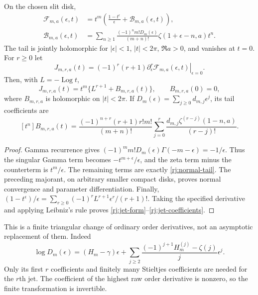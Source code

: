 \begin{theorem}\label{rj:pure}
On the chosen slit disk,
\begin{align}
 \mathcal F_{m,a}(\epsilon,t)
 &=t^m\left(\frac{1-t^\epsilon}{\epsilon}
                  +\mathcal B_{m,a}(\epsilon,t)\right),\label{rj:normal-form}\\
 \mathcal B_{m,a}(\epsilon,t)
 &=\sum_{n\ge1}\frac{(-1)^n m!D_m(\epsilon)}{(m+n)!}
                  \zeta(1+\epsilon-n,a)t^n.\label{rj:normal-tail}
\end{align}
The tail is jointly holomorphic for $|\epsilon|<1$, $|t|<2\pi$,
$\Re a>0$, and vanishes at $t=0$. For $r\ge0$ let
\[
 J_{m,r,a}(t)=(-1)^r(r+1)
       \left.\partial_\epsilon^r\mathcal F_{m,a}(\epsilon,t)
       \right|_{\epsilon=0}.
\]
Then, with $L=-\operatorname{Log}t$,
\begin{equation}\label{rj:jet-form}
 J_{m,r,a}(t)=t^m\{L^{r+1}+B_{m,r,a}(t)\},\qquad
 B_{m,r,a}(0)=0,
\end{equation}
where $B_{m,r,a}$ is holomorphic on $|t|<2\pi$.
If $D_m(\epsilon)=\sum_{j\ge0}d_{m,j}\epsilon^j$, its tail coefficients are
\begin{equation}\label{rj:jet-coefficients}
 [t^n]B_{m,r,a}(t)
 =\frac{(-1)^{n+r}(r+1)r!m!}{(m+n)!}
   \sum_{j=0}^r\frac{d_{m,j}\zeta^{(r-j)}(1-n,a)}{(r-j)!}.
\end{equation}
\end{theorem}
\begin{proof}
Gamma recurrence gives
$(-1)^m m!D_m(\epsilon)\Gamma(-m-\epsilon)=-1/\epsilon$.
Thus the singular Gamma term becomes $-t^{m+\epsilon}/\epsilon$,
and the zeta term minus the counterterm is $t^m/\epsilon$.
The remaining terms are exactly \eqref{rj:normal-tail}.
The preceding majorant, on arbitrary smaller compact disks, proves
normal convergence and parameter differentiation. Finally,
$(1-t^\epsilon)/\epsilon
=\sum_{r\ge0}(-1)^rL^{r+1}\epsilon^r/(r+1)!$.
Taking the specified derivative and applying Leibniz's rule proves
\eqref{rj:jet-form}--\eqref{rj:jet-coefficients}.
\end{proof}

This is a finite triangular change of ordinary order derivatives, not an
asymptotic replacement of them. Indeed
\[
 \log D_m(\epsilon)=(H_m-\gamma)\epsilon
 +\sum_{j\ge2}\frac{(-1)^{j+1}H_m^{(j)}-\zeta(j)}j\epsilon^j.
\]
Only its first $r$ coefficients and finitely many Stieltjes coefficients
are needed for the $r$th jet. The coefficient of the highest raw order
derivative is nonzero, so the finite transformation is invertible.

